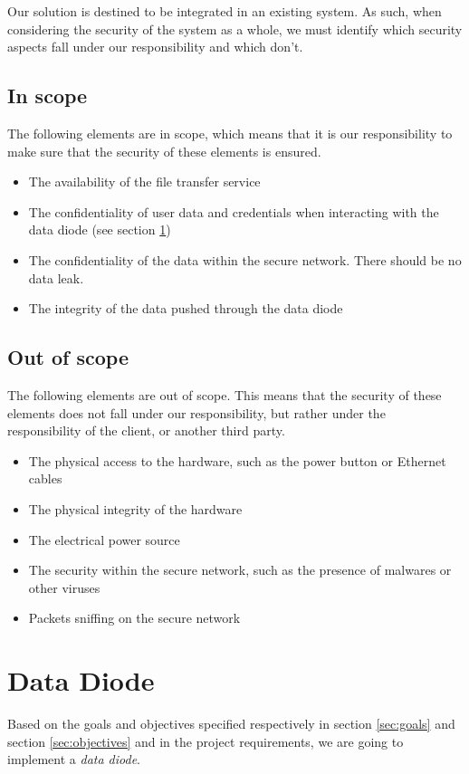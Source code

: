 \documentclass[a4paper,11pt]{article}
\begin{document}
Our solution is destined to be integrated in an existing system. As such, when considering the security of the system as a whole, we must identify which security aspects fall under our responsibility and which don't. 

\subsection{In scope}
The following elements are in scope, which means that it is our responsibility to make sure that the security of these elements is ensured.

\begin{itemize}
\item{The availability of the file transfer service}
\item{The confidentiality of user data and credentials when interacting with the data diode (see section \ref{sec:data-diode})}
\item{The confidentiality of the data within the secure network. There should be no data leak.}
\item{The integrity of the data pushed through the data diode}
\end{itemize}

\subsection{Out of scope}
\label{sec:outscope}
The following elements are out of scope. This means that the security of these elements does not fall under our responsibility, but rather under the responsibility of the client, or another third party.

\begin{itemize}
\item{The physical access to the hardware, such as the power button or Ethernet cables}
\item{The physical integrity of the hardware}
\item{The electrical power source}
\item{The security within the secure network, such as the presence of malwares or other viruses}
\item{Packets sniffing on the secure network}
\end{itemize}


\section{Data Diode}
\label{sec:data-diode}
Based on the goals and objectives specified respectively in section \ref{sec:goals} and section \ref{sec:objectives} and in the project requirements, we are going to implement a \textit{data diode}.\\
\end{document}
